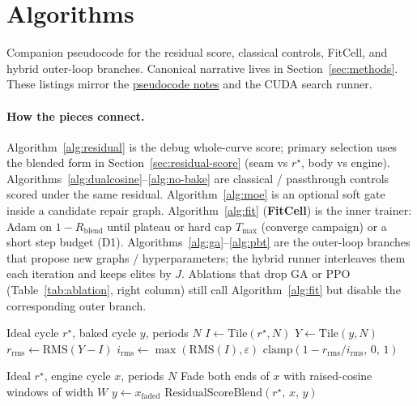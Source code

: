 \section{Algorithms}
\label{app:algorithms}

Companion pseudocode for the residual score, classical controls, FitCell, and hybrid outer-loop branches.
Canonical narrative lives in Section~\ref{sec:methods}.
These listings mirror the
\href{https://github.com/reeldemo/denoise-opt}{pseudocode notes}
and the CUDA search runner.

\paragraph{How the pieces connect.}
Algorithm~\ref{alg:residual} is the debug whole-curve score; primary selection uses the blended form in Section~\ref{sec:residual-score} (seam vs $r^{\star}$, body vs engine).
Algorithms~\ref{alg:dualcosine}--\ref{alg:no-bake} are classical / passthrough controls scored under the same residual.
Algorithm~\ref{alg:moe} is an optional soft gate inside a candidate repair graph.
Algorithm~\ref{alg:fit} (\textbf{FitCell}) is the inner trainer: Adam on $1-R_{\mathrm{blend}}$ until plateau or hard cap $T_{\max}$ (converge campaign) or a short step budget (D1).
Algorithms~\ref{alg:ga}--\ref{alg:pbt} are the outer-loop branches that propose new graphs / hyperparameters; the hybrid runner interleaves them each iteration and keeps elites by $J$.
Ablations that drop GA or PPO (Table~\ref{tab:ablation}, right column) still call Algorithm~\ref{alg:fit} but disable the corresponding outer branch.

\begin{algorithm}[H]
\caption{ResidualScore}
\label{alg:residual}
\begin{algorithmic}[1]
\Require Ideal cycle $r^{\star}$, baked cycle $y$, periods $N$
\State $I \gets \mathrm{Tile}(r^{\star}, N)$
\State $Y \gets \mathrm{Tile}(y, N)$
\State $r_{\mathrm{rms}} \gets \mathrm{RMS}(Y-I)$
\State $i_{\mathrm{rms}} \gets \max(\mathrm{RMS}(I), \varepsilon)$
\State \Return $\mathrm{clamp}(1 - r_{\mathrm{rms}}/i_{\mathrm{rms}},\,0,\,1)$
\end{algorithmic}
\end{algorithm}

\begin{algorithm}[H]
\caption{DualCosine baseline}
\label{alg:dualcosine}
\begin{algorithmic}[1]
\Require Ideal $r^{\star}$, engine cycle $x$, periods $N$
\State Fade both ends of $x$ with raised-cosine windows of width $W$
\State $y \gets x_{\mathrm{faded}}$
\State \Return $\mathrm{ResidualScoreBlend}(r^{\star},\,x,\,y)$
\end{algorithmic}
\end{algorithm}

